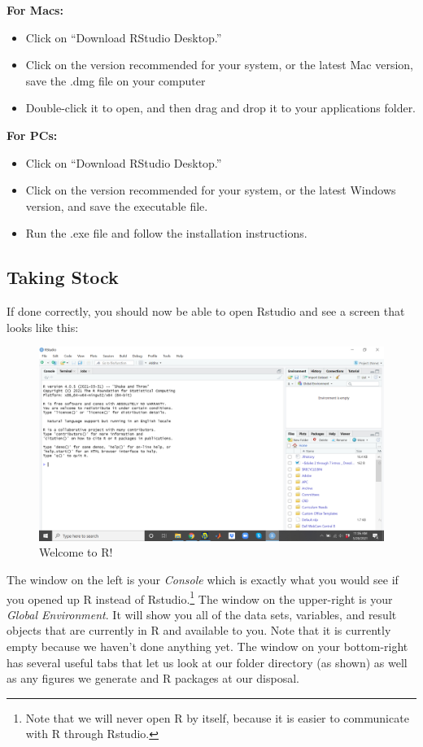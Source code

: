\documentclass[
]{book}
\begin{document}
\textbf{For Macs:}

\begin{itemize}
\item
  Click on ``Download RStudio Desktop.''
\item
  Click on the version recommended for your system, or the latest Mac version, save the .dmg file on your computer
\item
  Double-click it to open, and then drag and drop it to your applications folder.
\end{itemize}

\textbf{For PCs:}

\begin{itemize}
\item
  Click on ``Download RStudio Desktop.''
\item
  Click on the version recommended for your system, or the latest Windows version, and save the executable file.
\item
  Run the .exe file and follow the installation instructions.
\end{itemize}

\hypertarget{taking-stock}{%
\subsection{Taking Stock}\label{taking-stock}}

If done correctly, you should now be able to open Rstudio and see a screen that looks like this:

\begin{figure}

{\centering \includegraphics[width=0.75\linewidth]{images/Screenshot1} 

}

\caption{Welcome to R!}\label{fig:unnamed-chunk-29}
\end{figure}

The window on the left is your \emph{Console} which is exactly what you would see if you opened up R instead of Rstudio.\footnote{Note that we will never open R by itself, because it is easier to communicate with R through Rstudio.} The window on the upper-right is your \emph{Global Environment}. It will show you all of the data sets, variables, and result objects that are currently in R and available to you. Note that it is currently empty because we haven't done anything yet. The window on your bottom-right has several useful tabs that let us look at our folder directory (as shown) as well as any figures we generate and R packages at our disposal.
\end{document}
